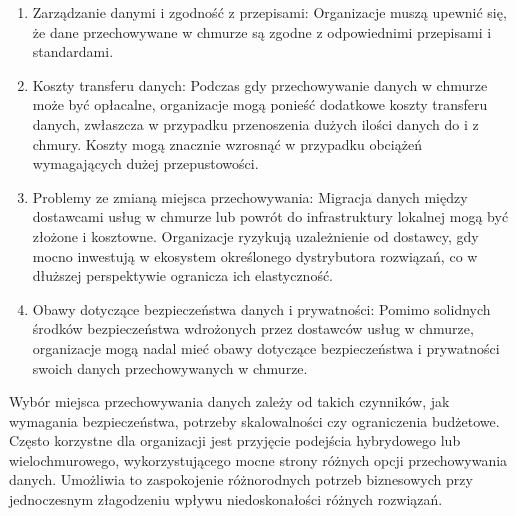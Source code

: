 \documentclass[12pt,a4paper,twoside]{article}
\begin{document}
\begin{itemize}
\begin{enumerate}
			\item Zarządzanie danymi i zgodność z przepisami: Organizacje muszą upewnić się, że dane przechowywane w chmurze są zgodne z odpowiednimi przepisami i standardami.
			\item Koszty transferu danych: Podczas gdy przechowywanie danych w chmurze może być opłacalne, organizacje mogą ponieść dodatkowe koszty transferu danych, zwłaszcza w przypadku przenoszenia dużych ilości danych do i z chmury. Koszty mogą znacznie wzrosnąć w przypadku obciążeń wymagających dużej przepustowości.
			\item Problemy ze zmianą miejsca przechowywania: Migracja danych między dostawcami usług w chmurze lub powrót do infrastruktury lokalnej mogą być złożone i kosztowne. Organizacje ryzykują uzależnienie od dostawcy, gdy mocno inwestują w ekosystem określonego dystrybutora rozwiązań, co w dłuższej perspektywie ogranicza ich elastyczność.
			\item Obawy dotyczące bezpieczeństwa danych i prywatności: Pomimo solidnych środków bezpieczeństwa wdrożonych przez dostawców usług w chmurze, organizacje mogą nadal mieć obawy dotyczące bezpieczeństwa i prywatności swoich danych przechowywanych w chmurze.
		\end{enumerate}
\end{itemize}\par
Wybór miejsca przechowywania danych zależy od takich czynników, jak wymagania bezpieczeństwa, potrzeby skalowalności czy ograniczenia budżetowe. Często korzystne dla organizacji jest przyjęcie podejścia hybrydowego lub wielochmurowego, wykorzystującego mocne strony różnych opcji przechowywania danych. Umożliwia to zaspokojenie różnorodnych potrzeb biznesowych przy jednoczesnym złagodzeniu wpływu niedoskonałości różnych rozwiązań.
\end{document}
